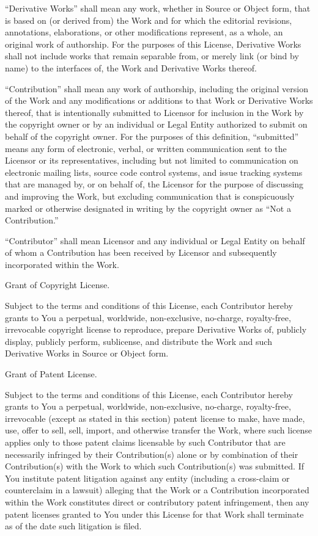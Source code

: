 \documentclass{article}
\begin{document}
  ``Derivative Works'' shall mean any work, whether in Source or
  Object form, that is based on (or derived from) the Work and for
  which the editorial revisions, annotations, elaborations, or other
  modifications represent, as a whole, an original work of
  authorship. For the purposes of this License, Derivative Works
  shall not include works that remain separable from, or merely link
  (or bind by name) to the interfaces of, the Work and Derivative
  Works thereof.

  ``Contribution'' shall mean any work of authorship, including the
  original version of the Work and any modifications or additions to
  that Work or Derivative Works thereof, that is intentionally
  submitted to Licensor for inclusion in the Work by the copyright
  owner or by an individual or Legal Entity authorized to submit on
  behalf of the copyright owner. For the purposes of this definition,
  ``submitted'' means any form of electronic, verbal, or written
  communication sent to the Licensor or its representatives,
  including but not limited to communication on electronic mailing
  lists, source code control systems, and issue tracking systems that
  are managed by, or on behalf of, the Licensor for the purpose of
  discussing and improving the Work, but excluding communication that
  is conspicuously marked or otherwise designated in writing by the
  copyright owner as ``Not a Contribution.''

  ``Contributor'' shall mean Licensor and any individual or Legal
  Entity on behalf of whom a Contribution has been received by
  Licensor and subsequently incorporated within the Work.

  Grant of Copyright License. 

  Subject to the terms and conditions of
  this License, each Contributor hereby grants to You a perpetual,
  worldwide, non-exclusive, no-charge, royalty-free, irrevocable
  copyright license to reproduce, prepare Derivative Works of,
  publicly display, publicly perform, sublicense, and distribute the
  Work and such Derivative Works in Source or Object form.

  Grant of Patent License. 

  Subject to the terms and conditions of
  this License, each Contributor hereby grants to You a perpetual,
  worldwide, non-exclusive, no-charge, royalty-free, irrevocable
  (except as stated in this section) patent license to make, have
  made, use, offer to sell, sell, import, and otherwise transfer the
  Work, where such license applies only to those patent claims
  licensable by such Contributor that are necessarily infringed by
  their Contribution(s) alone or by combination of their
  Contribution(s) with the Work to which such Contribution(s) was
  submitted. If You institute patent litigation against any entity
  (including a cross-claim or counterclaim in a lawsuit) alleging
  that the Work or a Contribution incorporated within the Work
  constitutes direct or contributory patent infringement, then any
  patent licenses granted to You under this License for that Work
  shall terminate as of the date such litigation is filed.
\end{document}

